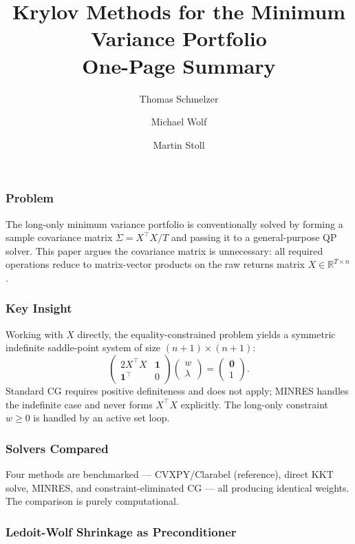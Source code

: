 \documentclass[10pt,twocolumn]{article}
\title{\textbf{Krylov Methods for the Minimum Variance Portfolio}\\[4pt]
       \large One-Page Summary}
\author{Thomas Schmelzer \and Michael Wolf \and Martin Stoll}
\date{}
\begin{document}
\maketitle
\thispagestyle{empty}

\subsubsection*{Problem}

The long-only minimum variance portfolio is conventionally solved by forming a sample covariance
matrix $\Sigma = X^\top X / T$ and passing it to a general-purpose QP solver. This paper argues
the covariance matrix is unnecessary: all required operations reduce to matrix-vector products on
the raw returns matrix $X \in \mathbb{R}^{T \times n}$.

\subsubsection*{Key Insight}

Working with $X$ directly, the equality-constrained problem yields a symmetric indefinite
saddle-point system of size $(n+1)\times(n+1)$:
\[
\begin{pmatrix} 2X^\top X & \mathbf{1} \\ \mathbf{1}^\top & 0 \end{pmatrix}
\begin{pmatrix} w \\ \lambda \end{pmatrix}
=
\begin{pmatrix} \mathbf{0} \\ 1 \end{pmatrix}.
\]
Standard CG requires positive definiteness and does not apply; MINRES \cite{paige1975} handles
the indefinite case and never forms $X^\top X$ explicitly. The long-only constraint $w \geq 0$
is handled by an active set loop.

\subsubsection*{Solvers Compared}

Four methods are benchmarked --- CVXPY/Clarabel (reference), direct KKT solve, MINRES, and
constraint-eliminated CG --- all producing identical weights. The comparison is purely
computational.

\subsubsection*{Ledoit-Wolf Shrinkage as Preconditioner}
\end{document}
